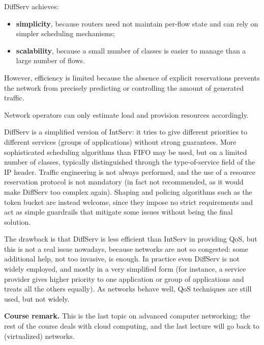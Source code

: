 DiffServ achieves:

\begin{itemize}
\item \textbf{simplicity}, because routers need not maintain per-flow state and can rely on simpler scheduling mechanisms;
\item \textbf{scalability}, because a small number of classes is easier to manage than a large number of flows.
\end{itemize}

However, efficiency is limited because the absence of explicit reservations prevents the network from precisely predicting or controlling the amount of generated traffic.

Network operators can only estimate load and provision resources accordingly.

DiffServ is a simplified version of IntServ: it tries to give different priorities to different services (groups of applications) without strong guarantees. More sophisticated scheduling algorithms than FIFO may be used, but on a limited number of classes, typically distinguished through the type-of-service field of the IP header. Traffic engineering is not always performed, and the use of a resource reservation protocol is not mandatory (in fact not recommended, as it would make DiffServ too complex again). Shaping and policing algorithms such as the token bucket are instead welcome, since they impose no strict requirements and act as simple guardrails that mitigate some issues without being the final solution.

The drawback is that DiffServ is less efficient than IntServ in providing QoS, but this is not a real issue nowadays, because networks are not so congested: some additional help, not too invasive, is enough. In practice even DiffServ is not widely employed, and mostly in a very simplified form (for instance, a service provider gives higher priority to one application or group of applications and treats all the others equally). As networks behave well, QoS techniques are still used, but not widely.

\begin{notebox}
	\textbf{Course remark.} This is the last topic on advanced computer networking; the rest of the course deals with cloud computing, and the last lecture will go back to (virtualized) networks.
\end{notebox}

